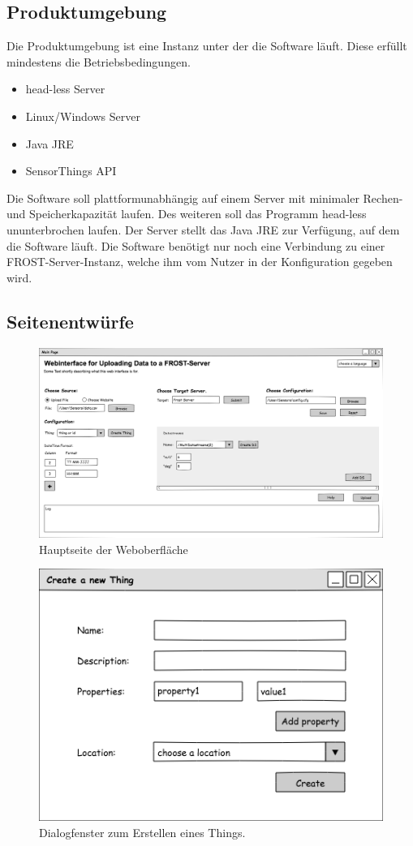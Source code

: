 \documentclass[12 pt]{article}
\begin{document}
\subsection{Produktumgebung}
Die Produktumgebung ist eine Instanz unter der die Software läuft. Diese erfüllt mindestens die Betriebsbedingungen.
\begin{itemize}
\item head-less Server
\item Linux/Windows Server
\item Java JRE
\item SensorThings API
\end{itemize}
Die Software soll plattformunabhängig auf einem Server mit minimaler Rechen- und Speicherkapazität laufen. Des weiteren soll das Programm head-less ununterbrochen laufen. Der Server stellt das Java JRE zur Verfügung, auf dem die Software läuft. Die Software benötigt nur noch eine Verbindung zu einer FROST-Server-Instanz, welche ihm vom Nutzer in der Konfiguration gegeben wird.

\subsection{Seitenentwürfe}
\begin{figure}[ht]
\centering
\includegraphics[scale=0.4, angle=90]{images/gui}
\caption{\label{fig:guiMain}Hauptseite der Weboberfläche}

\end{figure}

\begin{figure}[ht]
\centering
\includegraphics[scale=1]{images/create_thing}
\caption{\label{fig:thing}Dialogfenster zum Erstellen eines Things.}
\end{figure}
\end{document}
